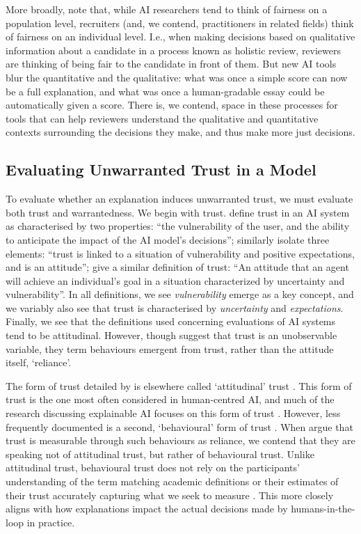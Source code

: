 More broadly, \textcite{alvero_ai_2020} note that, while AI researchers tend to think of fairness on a population level, recruiters (and, we contend, practitioners in related fields) think of fairness on an individual level. I.e., when making decisions based on qualitative information about a candidate in a process known as holistic review, reviewers are thinking of being fair to the candidate in front of them. But new AI tools blur the quantitative and the qualitative: what was once a simple score can now be a full explanation, and what was once a human-gradable essay could be automatically given a score. There is, we contend, space in these processes for tools that can help reviewers understand the qualitative and quantitative contexts surrounding the decisions they make, and thus make more just decisions.

\subsection{Evaluating Unwarranted Trust in a Model}
To evaluate whether an explanation induces unwarranted trust, we must evaluate both trust and warrantedness. We begin with trust. \textcite{jacovi_formalizing_2021} define trust in an AI system as characterised by two properties: ``the vulnerability of the user, and the ability to anticipate the impact of the AI model's decisions''; \textcite{vereschak_how_2021} similarly isolate three elements: ``trust is linked to a situation of vulnerability and positive expectations, and is an attitude''; \textcite{lee_trust_2004} give a similar definition of trust: ``An attitude that an agent will achieve an individual's goal in a situation characterized by uncertainty and vulnerability''. In all definitions, we see \emph{vulnerability} emerge as a key concept, and we variably also see that trust is characterised by \emph{uncertainty} and \emph{expectations}. Finally, we see that the definitions used concerning evaluations of AI systems tend to be attitudinal. However, though \textcite{vereschak_how_2021} suggest that trust is an unobservable variable, they term behaviours emergent from trust, rather than the attitude itself, `reliance'. 

The form of trust detailed by \textcite{vereschak_how_2021} is elsewhere called `attitudinal' trust \cite{crites_measuring_1994}. This form of trust is the one most often considered in human-centred AI, and much of the research discussing explainable AI focuses on this form of trust \cite{vereschak_how_2021, ford_play_2020, bansal_does_2021, yin_understanding_2019}. However, less frequently documented is a second, `behavioural' form of trust \cite{crites_measuring_1994}. When \textcite{jacovi_formalizing_2021,lee_trust_2004} argue that trust is measurable through such behaviours as reliance, we contend that they are speaking not of attitudinal trust, but rather of behavioural trust. Unlike attitudinal trust, behavioural trust does not rely on the participants' understanding of the term matching academic definitions or their estimates of their trust accurately capturing what we seek to measure \cite{jacovi_formalizing_2021}. This more closely aligns with how explanations impact the actual decisions made by humans-in-the-loop in practice.


